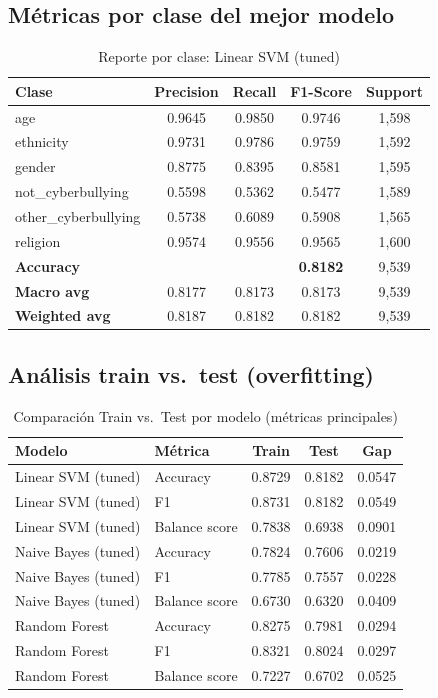 ﻿\documentclass[12pt,a4paper]{article}
\begin{document}
\subsection{Métricas por clase del mejor modelo}

\begin{table}[H]
\centering
\caption{Reporte por clase: Linear SVM (tuned)}
\label{tab:class_report}
\begin{tabular}{lcccc}
\toprule
Clase & Precision & Recall & F1-Score & Support \\
\midrule
age                  & 0.9645 & 0.9850 & 0.9746 & 1,598 \\
ethnicity            & 0.9731 & 0.9786 & 0.9759 & 1,592 \\
gender               & 0.8775 & 0.8395 & 0.8581 & 1,595 \\
not\_cyberbullying   & 0.5598 & 0.5362 & 0.5477 & 1,589 \\
other\_cyberbullying & 0.5738 & 0.6089 & 0.5908 & 1,565 \\
religion             & 0.9574 & 0.9556 & 0.9565 & 1,600 \\
\midrule
\textbf{Accuracy}    &        &        & \textbf{0.8182} & 9,539 \\
\textbf{Macro avg}   & 0.8177 & 0.8173 & 0.8173 & 9,539 \\
\textbf{Weighted avg}& 0.8187 & 0.8182 & 0.8182 & 9,539 \\
\bottomrule
\end{tabular}
\end{table}

\subsection{Análisis train vs.\ test (overfitting)}

\begin{table}[H]
\centering
\caption{Comparación Train vs.\ Test por modelo (métricas principales)}
\label{tab:overfitting}
\begin{tabular}{llccc}
\toprule
Modelo & Métrica & Train & Test & Gap \\
\midrule
Linear SVM (tuned) & Accuracy      & 0.8729 & 0.8182 & 0.0547 \\
Linear SVM (tuned) & F1            & 0.8731 & 0.8182 & 0.0549 \\
Linear SVM (tuned) & Balance score & 0.7838 & 0.6938 & 0.0901 \\
\midrule
Naive Bayes (tuned) & Accuracy     & 0.7824 & 0.7606 & 0.0219 \\
Naive Bayes (tuned) & F1           & 0.7785 & 0.7557 & 0.0228 \\
Naive Bayes (tuned) & Balance score& 0.6730 & 0.6320 & 0.0409 \\
\midrule
Random Forest       & Accuracy     & 0.8275 & 0.7981 & 0.0294 \\
Random Forest       & F1           & 0.8321 & 0.8024 & 0.0297 \\
Random Forest       & Balance score& 0.7227 & 0.6702 & 0.0525 \\
\bottomrule
\end{tabular}
\end{table}
\end{document}
